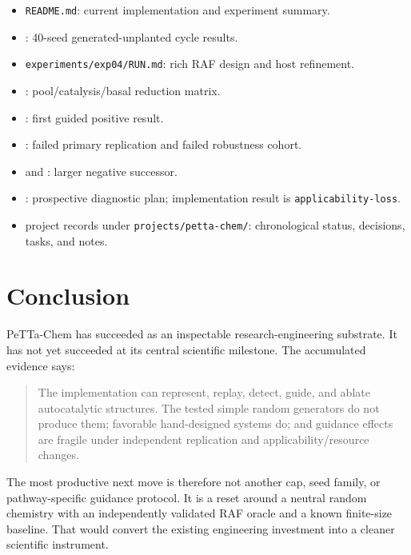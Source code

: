 \documentclass[11pt]{article}
\newcommand{\code}[1]{\texttt{#1}}
\begin{document}
\begin{itemize}
\item \code{README.md}: current implementation and experiment summary.
\item {}: 40-seed
  generated-unplanted cycle results.
\item \code{experiments/exp04/RUN.md}: rich RAF design and host refinement.
\item {}:
  pool/catalysis/basal reduction matrix.
\item {}: first guided
  positive result.
\item {}: failed primary
  replication and failed robustness cohort.
\item {} and
  : larger negative successor.
\item {}: prospective
  diagnostic plan; implementation result is \code{applicability-loss}.
\item project records under \code{projects/petta-chem/}: chronological status,
  decisions, tasks, and notes.
\end{itemize}

\section{Conclusion}

PeTTa-Chem has succeeded as an inspectable research-engineering substrate.  It
has not yet succeeded at its central scientific milestone.  The accumulated
evidence says:

\begin{quote}
The implementation can represent, replay, detect, guide, and ablate
autocatalytic structures.  The tested simple random generators do not produce
them; favorable hand-designed systems do; and guidance effects are fragile
under independent replication and applicability/resource changes.
\end{quote}

The most productive next move is therefore not another cap, seed family, or
pathway-specific guidance protocol.  It is a reset around a neutral random
chemistry with an independently validated RAF oracle and a known finite-size
baseline.  That would convert the existing engineering investment into a
cleaner scientific instrument.
\end{document}
